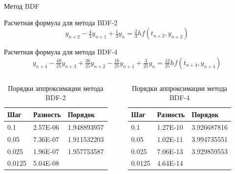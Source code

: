\documentclass[ignoreonframetext,unicode]{beamer}
\begin{document}
\begin{frame}{Метод BDF}

\begin{block}{Расчетная формула для метода BDF-2}	
	\[
	y_{n+2} - \tfrac43 y_{n+1} + \tfrac13 y_n = \tfrac23 h f(t_{n+2}, y_{n+2})
	\]
\end{block}

\begin{block}{Расчетная формула для метода BDF-4}	
	\vspace{-3mm}
	\[
	y_{n+4} - \tfrac{48}{25} y_{n+3} + \tfrac{36}{25} y_{n+2} - \tfrac{16}{25} y_{n+1} + \tfrac{3}{25} y_n = \tfrac{12}{25} h f(t_{n+4}, y_{n+4})
	\]
\end{block}

\vspace{-6mm}
\begin{columns}
	\begin{table}[!htbp]
		\centering
		\begin{tabular}{|l|l|l|} 
			\hline
			Шаг      & Разность     & Порядок            \\ 
			\hline
			0.1    & 2.57E-06 & 1.948893957  \\ 
			\hline
			0.05   & 7.36E-07 & 1.911532203  \\ 
			\hline
			0.025  & 1.96E-07 & 1.957753587  \\ 
			\hline
			0.0125 & 5.04E-08 &              \\
			\hline
		\end{tabular}
		\vspace*{4mm}
		\label{table-BDF-2}
		\caption{Порядки аппроксимации метода BDF-2}
	\end{table}
	
	\begin{table}[!htbp]
		\centering
		\begin{tabular}{|l|l|l|} 
			\hline
			Шаг      & Разность     & Порядок \\        \hline
			0.1    & 1.27E-10 & 3.926687816  \\ 
			\hline
			0.05   & 1.02E-11 & 3.994735551  \\ 
			\hline
			0.025  & 7.06E-13 & 3.929859553  \\ 
			\hline
			0.0125 & 4.64E-14 &              \\
			\hline
		\end{tabular}
		\vspace*{4mm}
		\label{table-BDF-4}
		\caption{Порядки аппроксимации метода BDF-4}
	\end{table}
\end{columns}

\end{frame}	
\end{document}
